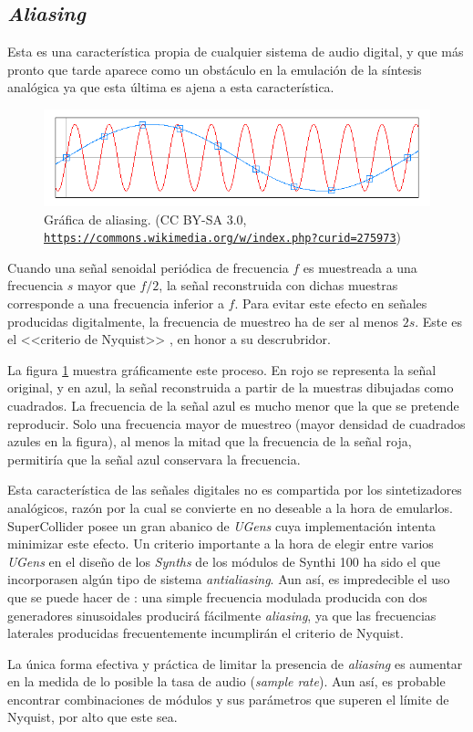 \subsection{\textit{Aliasing}}
Esta es una característica propia de cualquier sistema de audio digital, y que más pronto que tarde aparece como un obstáculo en la emulación de la síntesis analógica ya que esta última es ajena a esta característica.

\begin{figure}
	\centering
	\includegraphics[width=1\textwidth]{images/aliasing}
	\caption[Gráfica de \textit{aliasing}]{Gráfica de aliasing. (CC BY-SA 3.0,\\ \href{https://commons.wikimedia.org/w/index.php?curid=275973}{\texttt{https://commons.wikimedia.org/w/index.php?curid=275973}})}
	\label{fig:aliasing}
\end{figure}

Cuando una señal senoidal periódica de frecuencia $f$ es muestreada a una frecuencia $s$ mayor que $f/2$, la señal reconstruida con dichas muestras corresponde a una frecuencia inferior a $f$. Para evitar este efecto en señales producidas digitalmente, la frecuencia de muestreo ha de ser al menos $2s$. Este es el <<criterio de Nyquist>> \cite{nyquist}, en honor a su descrubridor. 

La figura \ref{fig:aliasing} muestra gráficamente este proceso. En rojo se representa la señal original, y en azul, la señal reconstruida a partir  de la muestras dibujadas como cuadrados. La frecuencia de la señal azul es mucho menor que la que se pretende reproducir. Solo una frecuencia mayor de muestreo (mayor densidad de cuadrados azules en la figura), al menos la mitad que la frecuencia de la señal roja, permitiría que la señal azul conservara la frecuencia.

Esta característica de las señales digitales no es compartida por los sintetizadores analógicos, razón por la cual se convierte en no deseable a la hora de emularlos. SuperCollider posee un gran abanico de \textit{UGens} cuya implementación intenta minimizar este efecto. Un criterio importante a la hora de elegir entre varios \textit{UGens} en el diseño de los \textit{Synths} de los módulos de Synthi 100 ha sido el que incorporasen algún tipo de sistema \textit{antialiasing}. Aun así, es impredecible el uso que se puede hacer de \appName: una simple frecuencia modulada producida con dos generadores sinusoidales producirá fácilmente \textit{aliasing}, ya que las frecuencias laterales producidas frecuentemente incumplirán el criterio de Nyquist.

La única forma efectiva y práctica de limitar la presencia de \textit{aliasing} es aumentar en la medida de lo posible la tasa de audio (\textit{sample rate}). Aun así, es probable encontrar combinaciones de módulos y sus parámetros que superen el límite de Nyquist, por alto que este sea.




